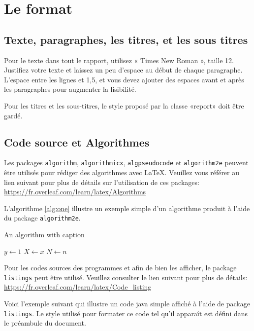 \chapter{Le format}

\section{Texte, paragraphes, les titres, et les sous titres}
Pour le texte dans tout le rapport, utilisez « Times New Roman », taille 12. Justifiez votre texte et laissez un peu d’espace au début de chaque paragraphe. L’espace entre les lignes et 1,5, et vous devez ajouter des espaces avant et après les paragraphes pour augmenter la lisibilité. 

Pour les titres et les sous-titres, le style proposé par la classe  «report» doit être gardé.

\section{Code source et Algorithmes}
Les packages \verb|algorithm|, \verb|algorithmicx|, \verb|algpseudocode| et \verb|algorithm2e| peuvent être utilisés pour rédiger des algorithmes avec \LaTeX. Veuillez vous référer au lien suivant pour plus de détails sur l'utilisation de ces packages: \url{https://fr.overleaf.com/learn/latex/Algorithms}

L'algorithme \ref{alg:one} illustre un exemple simple d'un algorithme produit à l'aide du package \verb|algorithm2e|.

{}

\begin{algorithm}[hbt!]
\caption{An algorithm with caption}\label{alg:one}
$y \gets 1$\;
$X \gets x$\;
$N \gets n$\;
\end{algorithm}

Pour les codes sources des programmes et afin de bien les afficher, le package \verb|listings| peut être utilisé. Veuillez consulter le lien suivant pour plus de détails: \url{https://fr.overleaf.com/learn/latex/Code_listing}  

Voici l'exemple suivant qui illustre un code java simple affiché à l'aide de package \verb|listings|. Le style utilisé pour formater ce code tel qu'il apparaît est défini dans le préambule du document.

